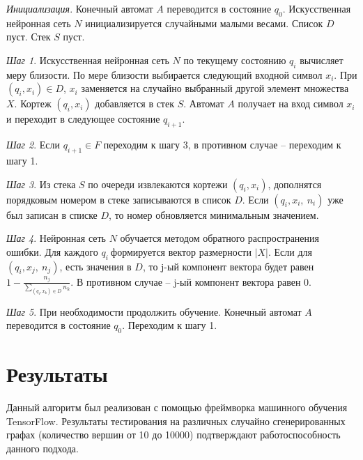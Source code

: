     \emph{Инициализация}. Конечный автомат \(A\) переводится в состояние
    \(q_{0}\). Искусственная нейронная сеть \(N\) инициализируется
    случайными малыми весами. Список \(D\) пуст. Стек \(S\) пуст.
    
    \emph{Шаг 1}. Искусственная нейронная сеть \(N\) по текущему состоянию
    \(q_{i}\) вычисляет меру близости. По мере близости выбирается следующий
    входной символ \(x_{i}\). При \(\left( q_{i},x_{i} \right) \in D\),
    \(x_{i}\) заменяется на случайно выбранный другой элемент множества
    \(X\). Кортеж \(\left( q_{i},x_{i} \right)\) добавляется в стек \(S\).
    Автомат \(A\) получает на вход символ \(x_{i}\) и переходит в следующее
    состояние \(q_{i + 1}\).
    
    \emph{Шаг 2}. Если \(q_{i + 1} \in F\) переходим к шагу 3, в противном
    случае -- переходим к шагу 1.
    
    \emph{Шаг 3}. Из стека \(S\) по очереди извлекаются кортежи
    \(\left( q_{i},x_{i} \right)\), дополнятся порядковым номером в стеке записываются в список \(D\). Если
    \(\left( q_{i},x_{i},\ n_{i} \right)\) уже был записан в списке \(D\),
    то номер обновляется минимальным значением.
    
    \emph{Шаг 4}. Нейронная сеть \(N\) обучается методом обратного
    распространения ошибки. Для каждого \(q_{i}\ \)формируется вектор
    размерности \(\left| X \right|\). Если для
    \(\left( q_{i},x_{j},\ n_{j} \right)\), есть значения в \(D\), то j-ый
    компонент вектора будет равен
    \(1 - \frac{n_{j}}{\sum_{\left( q_{i},x_{k} \right) \in D}^{}n_{k}}\). В
    противном случае -- j-ый компонент вектора равен 0.
    
    \emph{Шаг 5}. При необходимости продолжить обучение. Конечный автомат
    \(A\) переводится в состояние \(q_{0}\). Переходим к шагу 1.

	\section{Результаты}
    
    Данный алгоритм был реализован с помощью фреймворка машинного обучения
    TensorFlow. Результаты тестирования на различных случайно
    сгенерированных графах (количество вершин от 10 до 10000) подтверждают
    работоспособность данного подхода.